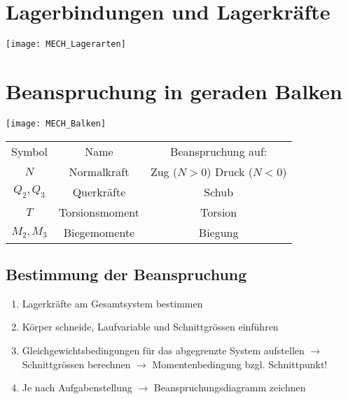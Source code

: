 \documentclass[numerate]{cheatsheet}
\begin{document}
    \section{Lagerbindungen und Lagerkräfte}    
    \begin{center}
        \texttt{[image: MECH\_Lagerarten]}
    \end{center}

    \section{Beanspruchung in geraden Balken}
        \begin{minipage}{0.3\linewidth}
            \begin{scriptsize}
                \texttt{[image: MECH\_Balken]}
            \end{scriptsize}
        \end{minipage}
        \begin{minipage}{0.68\linewidth}
            \begin{scriptsize}
                \begin{tabular}{|c|c|c|}
                    \hline
                    Symbol & Name & Beanspruchung auf:\\
                    \hhline{|=|=|=|}
                    $N$ & Normalkraft & \thead{\scriptsize Zug ($N > 0$) \\ \scriptsize Druck ($N<0$)}\\
                    \hline
                    $Q_2, Q_3$ & Querkräfte & Schub\\
                    \hline
                    $T$ & Torsionsmoment & Torsion\\
                    \hline
                    $M_2, M_3$ & Biegemomente & Biegung\\
                    \hline
                \end{tabular}
            \end{scriptsize}      
        \end{minipage}    

    \subsection{Bestimmung der Beanspruchung}
        \begin{scriptsize}
            \begin{enumerate}
                \item Lagerkräfte am Gesamtsystem bestimmen
                \item Körper schneide, Laufvariable und Schnittgrössen einführen
                \item Gleichgewichtsbedingungen für das abgegrenzte System aufstellen $\to$ Schnittgrössen berechnen $\to$ Momentenbedingung bzgl. Schnittpunkt!
                \item Je nach Aufgabenstellung $\to$ Beanspruchungsdiagramm zeichnen
            \end{enumerate}
        \end{scriptsize}    
\cbreak
\end{document}
